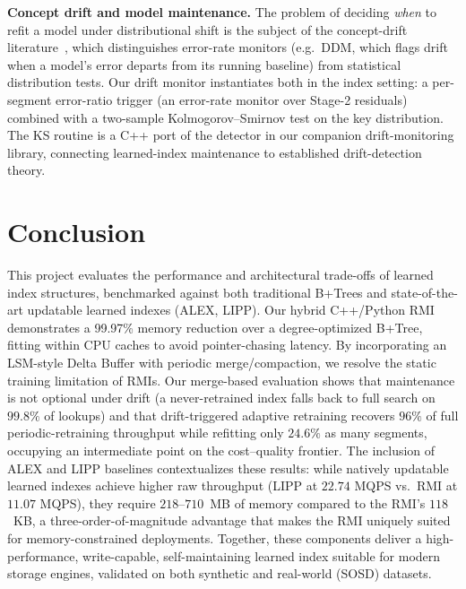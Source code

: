 \documentclass[sigconf,nonacm]{acmart}
\begin{document}
\noindent\textbf{Concept drift and model maintenance.} The problem of deciding \emph{when} to refit a model under distributional shift is the subject of the concept-drift literature~\cite{gama2014survey}, which distinguishes error-rate monitors (e.g.\ DDM, which flags drift when a model's error departs from its running baseline) from statistical distribution tests. Our drift monitor instantiates both in the index setting: a per-segment error-ratio trigger (an error-rate monitor over Stage-2 residuals) combined with a two-sample Kolmogorov--Smirnov test on the key distribution. The KS routine is a C++ port of the detector in our companion drift-monitoring library, connecting learned-index maintenance to established drift-detection theory.

\section{Conclusion}
This project evaluates the performance and architectural trade-offs of learned index structures, benchmarked against both traditional B+Trees and state-of-the-art updatable learned indexes (ALEX, LIPP). Our hybrid C++/Python RMI demonstrates a 99.97\% memory reduction over a degree-optimized B+Tree, fitting within CPU caches to avoid pointer-chasing latency. By incorporating an LSM-style Delta Buffer with periodic merge/compaction, we resolve the static training limitation of RMIs. Our merge-based evaluation shows that maintenance is not optional under drift (a never-retrained index falls back to full search on $99.8\%$ of lookups) and that drift-triggered adaptive retraining recovers $96\%$ of full periodic-retraining throughput while refitting only $24.6\%$ as many segments, occupying an intermediate point on the cost--quality frontier. The inclusion of ALEX and LIPP baselines contextualizes these results: while natively updatable learned indexes achieve higher raw throughput (LIPP at $22.74$ MQPS vs.\ RMI at $11.07$ MQPS), they require $218$--$710$~MB of memory compared to the RMI's $118$~KB, a three-order-of-magnitude advantage that makes the RMI uniquely suited for memory-constrained deployments. Together, these components deliver a high-performance, write-capable, self-maintaining learned index suitable for modern storage engines, validated on both synthetic and real-world (SOSD) datasets.



\end{document}

